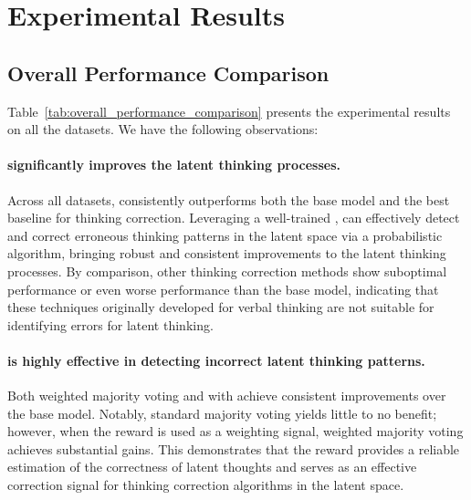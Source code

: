 \documentclass{article} %
\begin{document}
\section{Experimental Results}
\subsection{Overall Performance Comparison}

Table~\ref{tab:overall_performance_comparison} presents the experimental results on all the datasets. We have the following observations:
%
\paragraph*{\LTO significantly improves the latent thinking processes.}
%
Across all datasets, \LTO consistently outperforms both the base model and the best baseline for thinking correction. 
%
Leveraging a well-trained \LRM, \LTO can effectively detect and correct erroneous thinking patterns in the latent space via a probabilistic algorithm, bringing robust and consistent improvements to the latent thinking processes. 
%
By comparison, other thinking correction methods show suboptimal performance or even worse performance than the base model, indicating that these techniques originally developed for verbal thinking are not suitable for identifying errors for latent thinking.
%
\paragraph*{\LRM is highly effective in detecting incorrect latent thinking patterns.} 
%
Both weighted majority voting and \LatentThinkingOptimization with \LRM achieve consistent improvements over the base model. 
%
Notably, standard majority voting yields little to no benefit; however, when the \LRM reward is used as a weighting signal, weighted majority voting achieves substantial gains. 
%
This demonstrates that the \LRM reward provides a reliable estimation of the correctness of latent thoughts and serves as an effective correction signal for thinking correction algorithms in the latent space.
%
\end{document}
